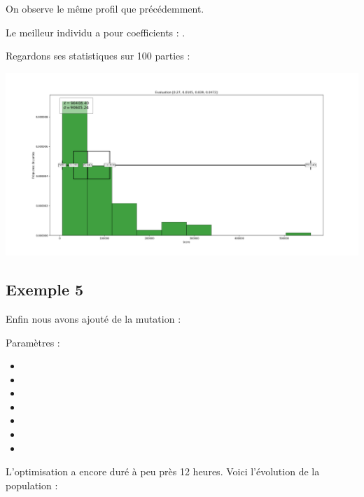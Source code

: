 On observe le même profil que précédemment.

\medskip

Le meilleur individu a pour coefficients : \pyth{[0.27, 0.0105, 0.839, 0.0472]}.
\newpage

Regardons ses statistiques sur 100 parties :

\includegraphics[scale=0.35]{media/results/Stats_Eval_0,27_0,0105_0,839_0,0472.png}

\newpage

\subsection{Exemple 5}

Enfin nous avons ajouté de la mutation :

Paramètres :
\begin{itemize}
	\item {}
	\item {}
	\item {}
	\item {}
	\item {}
	\item {}
	\item {}
\end{itemize} 

L'optimisation a encore duré à peu près 12 heures. Voici l'évolution de la population :


